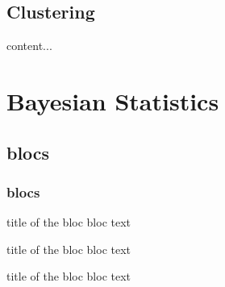 \documentclass{beamer}
\begin{document}
\subsection{Clustering}
\begin{frame}
	content...
\end{frame}


\section{Bayesian Statistics}

\subsection{blocs}
\begin{frame}\frametitle{blocs}

\begin{block}{title of the bloc}
bloc text
\end{block}

\begin{exampleblock}{title of the bloc}
bloc text
\end{exampleblock}


\begin{alertblock}{title of the bloc}
bloc text
\end{alertblock}
\end{frame}
\end{document}
